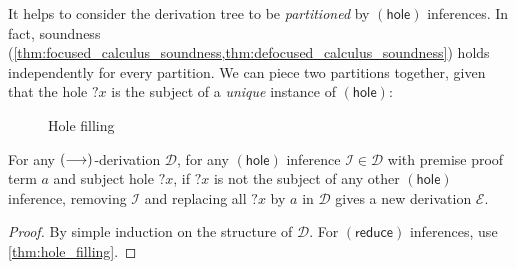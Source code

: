 \documentclass[twoside]{report}
\begin{document}
It helps to consider the derivation tree to be \emph{partitioned} by $(\mathsf{hole})$ inferences. In fact, soundness (\cref{thm:focused_calculus_soundness,thm:defocused_calculus_soundness}) holds independently for every partition. We can piece two partitions together, given that the hole ${?x}$ is the subject of a \emph{unique} instance of $(\mathsf{hole})$:

\begin{figure}[ht]
    \centering
    \caption{Hole filling}
    \label{fig:focused_calculus_hole_filling}
\end{figure}

\begin{proposition}
    \label{thm:focused_calculus_hole_filling}
    For any $(\longrightarrow)$-derivation $\mathcal D$, for any $(\mathsf{hole})$ inference $\mathcal I \in \mathcal D$ with premise proof term $a$ and subject hole ${?x}$, if ${?x}$ is not the subject of any other $(\mathsf{hole})$ inference, removing $\mathcal I$ and replacing all ${?x}$ by $a$ in $\mathcal D$ gives a new derivation $\mathcal E$.
\end{proposition}

\begin{proof}
    By simple induction on the structure of $\mathcal D$. For $(\mathsf{reduce})$ inferences, use \cref{thm:hole_filling}.
\end{proof}
\end{document}
